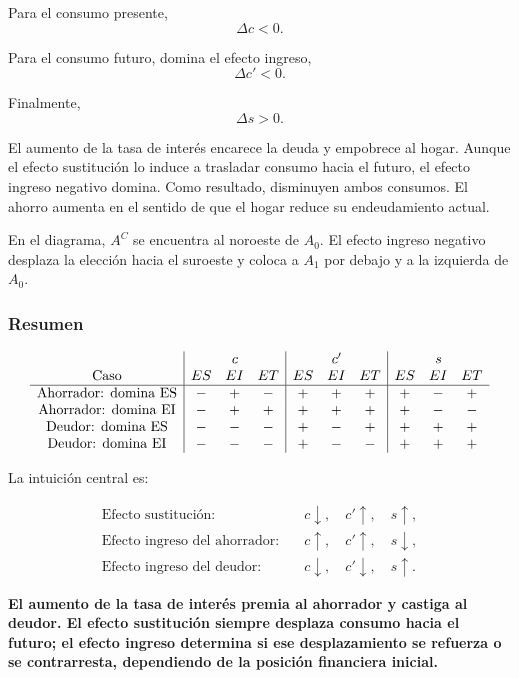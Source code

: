\documentclass[11pt]{article}
\begin{document}
Para el consumo presente,
\[
  \boxed{\Delta c<0}.
\]

Para el consumo futuro, domina el efecto ingreso,
\[
  \boxed{\Delta c'<0}.
\]

Finalmente,
\[
  \boxed{\Delta s>0}.
\]

El aumento de la tasa de interés encarece la deuda y empobrece al hogar. Aunque el efecto sustitución lo induce a trasladar consumo hacia el futuro, el efecto ingreso negativo domina. Como resultado, disminuyen ambos consumos. El ahorro aumenta en el sentido de que el hogar reduce su endeudamiento actual.

En el diagrama, \(A^C\) se encuentra al noroeste de \(A_0\). El efecto ingreso negativo desplaza la elección hacia el suroeste y coloca a \(A_1\) por debajo y a la izquierda de \(A_0\).

\subsubsection*{Resumen}

\[
\begin{array}{c|ccc|ccc|ccc}
 & \multicolumn{3}{c|}{c}
 & \multicolumn{3}{c|}{c'}
 & \multicolumn{3}{c}{s} \\
\text{Caso}
 & ES & EI & ET
 & ES & EI & ET
 & ES & EI & ET \\ \hline
\text{Ahorrador: domina ES}
 & - & + & -
 & + & + & +
 & + & - & + \\
\text{Ahorrador: domina EI}
 & - & + & +
 & + & + & +
 & + & - & - \\
\text{Deudor: domina ES}
 & - & - & -
 & + & - & +
 & + & + & + \\
\text{Deudor: domina EI}
 & - & - & -
 & + & - & -
 & + & + & +
\end{array}
\]

La intuición central es:

\[
\boxed{
\begin{aligned}
\text{Efecto sustitución:}\quad
& c\downarrow,\quad c'\uparrow,\quad s\uparrow,\\
\text{Efecto ingreso del ahorrador:}\quad
& c\uparrow,\quad c'\uparrow,\quad s\downarrow,\\
\text{Efecto ingreso del deudor:}\quad
& c\downarrow,\quad c'\downarrow,\quad s\uparrow.
\end{aligned}}
\]

\textbf{El aumento de la tasa de interés premia al ahorrador y castiga al deudor. El efecto sustitución siempre desplaza consumo hacia el futuro; el efecto ingreso determina si ese desplazamiento se refuerza o se contrarresta, dependiendo de la posición financiera inicial.}
\end{document}
